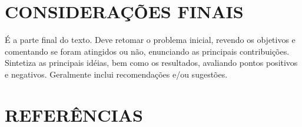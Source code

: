 \documentclass[
	12pt,				%
	oneside,			%
	a4paper,			%
	english,			%
	french,				%
	spanish,			%
	brazil,				%
	]{abntex2}
\theoremstyle{plain}
\theoremstyle{definition}
\begin{document}
%
%
%	
%
%
%
%
%

\chapter*[Conclusão]{CONSIDERAÇÕES FINAIS}

É a parte final do texto. Deve retomar o problema inicial, revendo os objetivos
e comentando se foram atingidos ou não, enunciando as principais contribuições.
Sintetiza as principais idéias, bem como os resultados, avaliando pontos positivos e
negativos. Geralmente inclui recomendações e/ou sugestões. 

	\chapter*[Referências]{REFERÊNCIAS}










\end{document}
